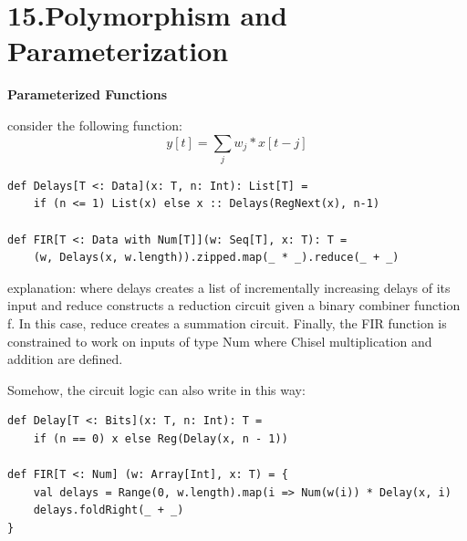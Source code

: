 \documentclass[11pt]{article}
\begin{document}
\section*{15.Polymorphism and Parameterization}
\textbf{Parameterized Functions}

consider the following function:
\[ y[t] = \sum_{j} w_j * x[t - j] \]
\begin{lstlisting}[style = myScalastyle]
def Delays[T <: Data](x: T, n: Int): List[T] = 
	if (n <= 1) List(x) else x :: Delays(RegNext(x), n-1)

def FIR[T <: Data with Num[T]](w: Seq[T], x: T): T = 
	(w, Delays(x, w.length)).zipped.map(_ * _).reduce(_ + _)
\end{lstlisting}
explanation:
where delays creates a list of incrementally increasing delays of its input and reduce constructs a reduction circuit given a binary combiner function f. In this case, reduce creates a summation circuit. Finally, the FIR function is constrained to work on inputs of type Num where Chisel multiplication and addition are defined.

Somehow, the circuit logic can also write in this way:
\begin{lstlisting}[style = myScalastyle]
def Delay[T <: Bits](x: T, n: Int): T = 
	if (n == 0) x else Reg(Delay(x, n - 1))

def FIR[T <: Num] (w: Array[Int], x: T) = {
	val delays = Range(0, w.length).map(i => Num(w(i)) * Delay(x, i)
	delays.foldRight(_ + _)
}
\end{lstlisting}
\end{document}
